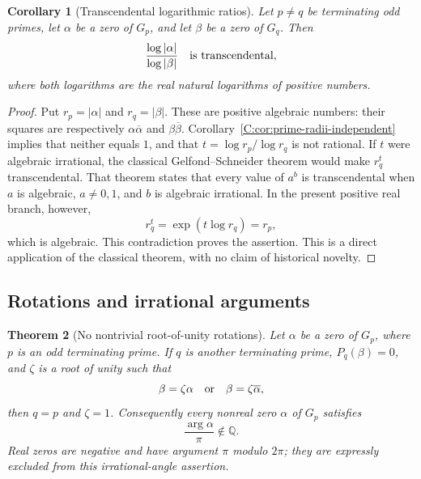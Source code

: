 \documentclass[11pt,a4paper]{article}
\newtheorem{theorem}{Theorem}[section]
\newtheorem{corollary}[theorem]{Corollary}
\theoremstyle{definition}
\theoremstyle{remark}
\numberwithin{equation}{section}
\begin{document}
\begin{corollary}[Transcendental logarithmic ratios]
\label{C:cor:prime-radii-log-transcendence}
Let $p\ne q$ be terminating odd primes, let $\alpha$ be a zero of
$G_p$, and let $\beta$ be a zero of $G_q$. Then
\[
 \frac{\log|\alpha|}{\log|\beta|}
 \quad\hbox{is transcendental},
\]
where both logarithms are the real natural logarithms of positive
numbers.
\end{corollary}

\begin{proof}
Put $r_p=|\alpha|$ and $r_q=|\beta|$. These are positive algebraic
numbers: their squares are respectively
$\alpha\overline\alpha$ and $\beta\overline\beta$.
Corollary~\ref{C:cor:prime-radii-independent} implies that neither equals
$1$, and that $t=\log r_p/\log r_q$ is not rational. If $t$ were
algebraic irrational, the classical Gelfond--Schneider theorem
\cite[Theorem~3.2]{R066} would make $r_q^t$ transcendental.
That theorem states that every value of $a^b$ is transcendental when
$a$ is algebraic, $a\ne0,1$, and $b$ is algebraic irrational.
In the present positive real branch, however,
\[
 r_q^t=\exp(t\log r_q)=r_p,
\]
which is algebraic. This contradiction proves the assertion.
This is a direct application of the classical theorem, with no claim
of historical novelty.
\end{proof}

\subsection{Rotations and irrational arguments}

\begin{theorem}[No nontrivial root-of-unity rotations]
\label{C:thm:prime-rotation-separation}
Let $\alpha$ be a zero of $G_p$, where $p$ is an odd terminating prime.
If $q$ is another terminating prime, $P_q(\beta)=0$, and $\zeta$ is a
root of unity such that
\[
 \beta=\zeta\alpha\quad\hbox{or}\quad
 \beta=\zeta\overline\alpha,
\]
then $q=p$ and $\zeta=1$.
Consequently every nonreal zero $\alpha$ of $G_p$ satisfies
\[
 \frac{\arg\alpha}{\pi}\notin\mathbb Q.
\]
Real zeros are negative and have argument $\pi$ modulo $2\pi$;
they are expressly excluded from this irrational-angle assertion.
\end{theorem}
\end{document}
